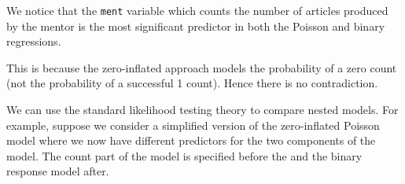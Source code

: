 \documentclass[
  ignorenonframetext,
]{beamer}
\begin{document}
\begin{frame}{}
\protect\hypertarget{section-35}{}
We notice that the \texttt{ment} variable which counts the number of
articles produced by the mentor is the most significant predictor in
both the Poisson and binary regressions.

\vspace{12pt}

This is because the zero-inflated approach models the probability of a
zero count (not the probability of a successful 1 count). Hence there is
no contradiction.

\vspace{12pt}

We can use the standard likelihood testing theory to compare nested
models. For example, suppose we consider a simplified version of the
zero-inflated Poisson model where we now have different predictors for
the two components of the model. The count part of the model is
specified before the \textbar{} and the binary response model after.
\end{frame}
\end{document}
